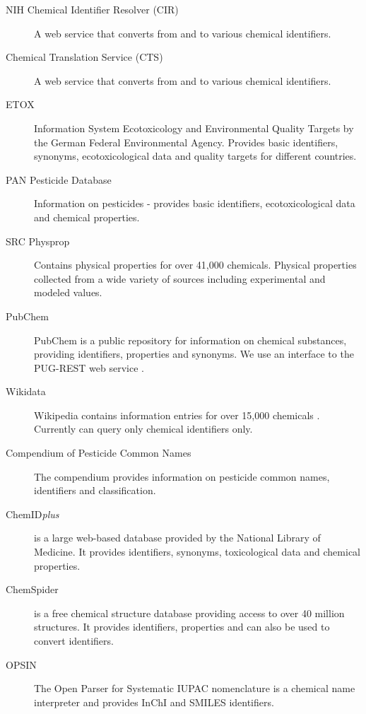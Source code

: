 \documentclass[article, shortnames]{jss}\usepackage[]{graphicx}\usepackage[]{color}
\begin{document}
\begin{description}
  \item[NIH Chemical Identifier Resolver (CIR) \citep{cir}]{A web service that converts from and to various chemical identifiers.}
  \item[Chemical Translation Service (CTS) \citep{Wohlgemuth_Haldiya_Willighagen_Kind_Fiehn_2010}]{A web service that converts from and to various chemical identifiers.}
  \item[ETOX \citep{etox}]{Information System Ecotoxicology and Environmental Quality Targets by the German Federal Environmental Agency. Provides basic identifiers, synonyms, ecotoxicological data and quality targets for different countries.}
  \item[PAN Pesticide Database \citep{pan}]{Information on pesticides - provides basic identifiers, ecotoxicological data and chemical properties.}
  \item[SRC Physprop \citep{physprop}]{Contains physical properties for over 41,000 chemicals.
  Physical properties collected from a wide variety of sources including experimental and modeled values.}
  \item[PubChem \citep{Kim_2016}]{PubChem is a public repository for information on chemical substances, providing identifiers, properties and synonyms.
  We use an interface to the PUG-REST web service \citep{Kim_Thiessen_Bolton_Bryant_2015}.}
  \item[Wikidata \citep{wiki}]{Wikipedia contains information entries for over 15,000 chemicals \citep{Ertl_Patiny_Sander_Rufener_Zasso_2015}. Currently  can query only chemical identifiers only.}
  \item[Compendium of Pesticide Common Names \citep{wood}]{The compendium provides information on pesticide common names, identifiers and classification.}
  \item[ChemID\emph{plus} \citep{Tomasulo_2002}]{is a large web-based database provided by the National Library of Medicine. It provides identifiers, synonyms, toxicological data and chemical properties.}
  \item[ChemSpider \citep{pence_chemspider:_2010}]{is a free chemical structure database providing access to over 40 million structures. It provides identifiers, properties and can also be used to convert identifiers.}
  \item[OPSIN  \citep{Lowe_Corbett_Murray-Rust_Glen_2011}]{The Open Parser for Systematic IUPAC nomenclature is a chemical name interpreter and provides InChI and SMILES identifiers.}
\end{description}
\end{document}
